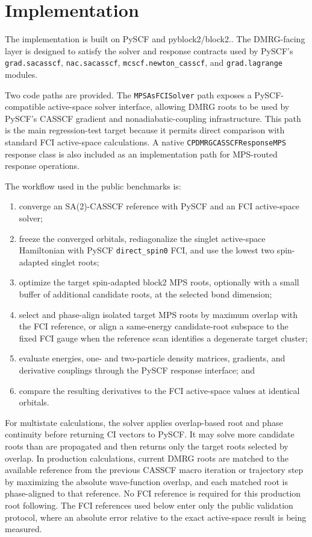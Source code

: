 \documentclass[journal=jctcce,manuscript=article]{achemso}
\begin{document}
\section{Implementation}

The implementation is built on PySCF\cite{Sun2018PySCF,Sun2020PySCF} and
pyblock2/block2.\cite{Zhai2023Block2}.  The DMRG-facing layer is designed to
satisfy the solver and response contracts used by PySCF's
\texttt{grad.sacasscf}, \texttt{nac.sacasscf},
\texttt{mcscf.newton\_casscf}, and \texttt{grad.lagrange} modules.

Two code paths are provided.  The \texttt{MPSAsFCISolver} path exposes a
PySCF-compatible active-space solver interface, allowing DMRG roots to be
used by PySCF's CASSCF gradient and nonadiabatic-coupling infrastructure.
This path is the main regression-test target because it permits direct
comparison with standard FCI active-space calculations.  A native
\texttt{CPDMRGCASSCFResponseMPS} response class is also included as an
implementation path for MPS-routed response operations.

The workflow used in the public benchmarks is:
\begin{enumerate}
\item converge an SA(2)-CASSCF reference with PySCF and an FCI active-space
solver;
\item freeze the converged orbitals, rediagonalize the singlet active-space
Hamiltonian with PySCF \texttt{direct\_spin0} FCI, and use the lowest two
spin-adapted singlet roots;
\item optimize the target spin-adapted block2 MPS roots, optionally with a
small buffer of additional candidate roots, at the selected bond dimension;
\item select and phase-align isolated target MPS roots by maximum overlap with
the FCI reference, or align a same-energy candidate-root subspace to the fixed
FCI gauge when the reference scan identifies a degenerate target cluster;
\item evaluate energies, one- and two-particle density matrices, gradients,
and derivative couplings through the PySCF response interface; and
\item compare the resulting derivatives to the FCI active-space values at
identical orbitals.
\end{enumerate}

For multistate calculations, the solver applies overlap-based root and phase
continuity before returning CI vectors to PySCF.  It may solve more
candidate roots than are propagated and then returns only the target roots
selected by overlap.  In production calculations, current DMRG roots are
matched to the available reference from the previous CASSCF macro iteration
or trajectory step by maximizing the absolute wave-function overlap, and each
matched root is phase-aligned to that reference.  No FCI reference is
required for this production root following.  The FCI references used below
enter only the public validation protocol, where an absolute error relative
to the exact active-space result is being measured.
\end{document}
